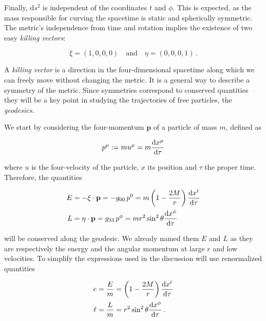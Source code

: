 Finally, $\mathrm{d}s^2$ is independent of the coordinates $t$ and $\phi$.
This is expected, as the mass responsible for curving the spacetime is static
and spherically symmetric.
The metric’s independence from time and rotation implies the existence of two
easy \textit{killing vectors}:

\begin{equation}
    \xi = (1, 0, 0, 0) \quad \text{and} \quad \eta = (0, 0, 0, 1) \, .
    \label{cap1:eq:xi_eta}
\end{equation}

A \textit{killing vector} is a direction in the four-dimensional spacetime
along which we can freely move without changing the metric.
It is a general way to describe a symmetry of the metric.
Since symmetries correspond to conserved quantities they will be a key point in
studying the trajectories of free particles, the \textit{geodesics}.

We start by considering the four-momentum $\mathbf{p}$ of a particle of mass
$m$, defined as

\begin{equation}
    p^\mu := m u^\mu = m \dv{x^\mu}{\tau}
\end{equation}

where $u$ is the four-velocity of the particle, $x$ its position and $\tau$ the
proper time.
Therefore, the quantities

\begin{align*}
    E &= - \mathbf{\xi \cdot p} =
    - g_{00} \, p^0 = m \left( 1 - \frac{2M}{r} \right) \dv{x^t}{\tau} \\
    L &= \mathbf{\eta \cdot p} =
    g_{33} \, p^\phi = m r^2 \sin^2 \theta \dv{x^\phi}{\tau}
\end{align*}

will be conserved along the geodesic.
We already named them $E$ and $L$ as they are respectively the energy and the
angular momentum at large $r$ and low velocities.
To simplify the expressions used in the discussion will use renormalized
quantities

\begin{subequations}
    \begin{align}
        e &= \frac{E}{m} = \left( 1 - \frac{2M}{r} \right) \dv{x^t}{\tau}
        \label{cap1:eq:conserved_e} \\
        \ell &= \frac{L}{m} = r^2 \sin^2 \theta \dv{x^\phi}{\tau} \, .
        \label{cap1:eq:conserved_l}
    \end{align}
\end{subequations}

